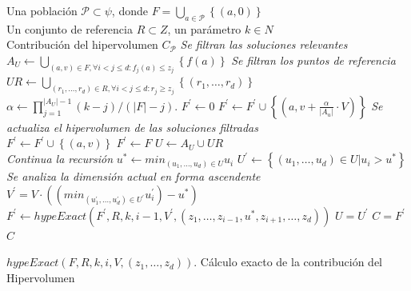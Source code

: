 \begin{algorithm}
\begin{algorithmic}[1]	
      \REQUIRE Una poblaci\'on $\mathcal{P} \subset \psi$, donde $F= \bigcup_{a \in \mathcal{P}} \left\{ \left(a, 0 \right) \right\}$\\
      Un conjunto de referencia $R \subset Z$, un par\'ametro $k \in N$\\
      \ENSURE Contribuci\'on del hipervolumen $C_{\mathcal{P}}$
	\STATE \textit{Se filtran las soluciones relevantes} $A_U \leftarrow \bigcup_{\left(a,v\right)\in F, \forall i<j\leq d:f_{j}\left(a\right)\leq z_{j}}\left\{f\left(a\right)\right\} $ 
	\STATE \textit{Se filtran los puntos de referencia} $UR \leftarrow \bigcup_{\left(r_1,\ldots,r_d\right)\in R, \forall i<j\leq d:r_{j}\geq z_{j}} \left\{\left(r_1,\ldots,r_d\right)\right\}$ 
		\STATE $\alpha \leftarrow \prod^{\left|A_{U}\right|-1}_{j=1} \left(k-j\right)/\left(\left|F\right| - j\right)$.			
		\STATE $F^{'} \leftarrow 0$
				\STATE $F^{'} \leftarrow F^{'} \cup \left\{\left(a,v + \frac{\alpha}{\left|A_{u}\right|}\cdot V\right)\right\}$
			\ELSE 
				\STATE \textit{Se actualiza el hipervolumen de las soluciones filtradas}\\
				$F^{'} \leftarrow F^{'} \cup \left\{\left(a,v\right)\right\}$
			\ENDIF
		\ENDFOR
	\ELSE {} 
		\STATE $F^{'} \leftarrow F$ 
		\STATE $U \leftarrow A_{U} \cup UR$ \\
		\textit{Continua la recursi\'on}   
			\STATE $u^{*} \leftarrow min_{\left(u_1,\ldots,u_d\right)\in U} u_i$ 
			\STATE $U^{'}\leftarrow \left\{\left(u_1,\ldots,u_d\right)\in U | u_i > u^{*} \right\}$\\
			\textit{Se analiza la dimensi\'on actual en forma ascendente}
				\STATE $V^{'} = V \cdot \left( \left(min_{\left(u^{'}_1,\ldots,u^{'}_d\right)\in U^{'}} u^{'}_i\right)-u^{*}\right) $
				\STATE $F^{'} \leftarrow hypeExact \left(F^{'},R,k,i-1,V^{'},\left(z_{1},\ldots,z_{i-1},u^{*},z_{i+1},\ldots,z_{d}\right)\right)$
			\ENDIF 
			\STATE $U=U^{'}$
		\ENDWHILE
		\ENDIF
	\ENDIF		
	\STATE $C = F^{'} $
	\RETURN  $C$
  \end{algorithmic}
\caption[$hypeExact$]{$hypeExact \left(F,R,k,i,V,\left(z_{1},\ldots,z_{d}\right)\right)$. C\'alculo exacto de la contribuci\'on del Hipervolumen}
\label{alg:hvexac}
\end{algorithm}

